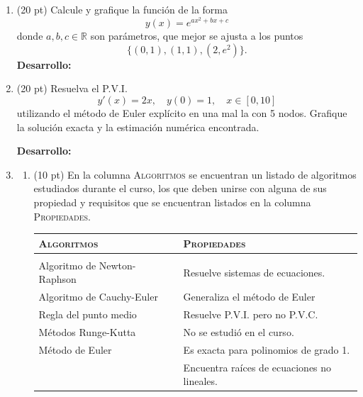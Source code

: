 \documentclass[11pt]{article}
\begin{document}
\begin{enumerate}
\newpage 
\item  (20 pt)
Calcule y grafique la funci\'on de la forma
$$
y(x)=e^{ax^2+bx+c}
$$
donde $a,b,c\in\mathbb{R}$ son par\'ametros, que mejor se ajusta a los puntos
$$
\{(0,1),(1,1),(2,e^2)\}.
$$
\textbf{Desarrollo:}


\newpage
\item  (20 pt) Resuelva el P.V.I.
$$ 
y'(x)=2x, \quad y(0)=1, \quad x\in[0,10]
$$
utilizando el método de Euler explícito en una mal
la con 5 nodos. Grafique la soluci\'on exacta y la estimaci\'on num\'erica encontrada.

\textbf{Desarrollo:}

\newpage
\item  \begin{enumerate}
\item (10 pt) En la columna \textsc{Algoritmos} se encuentran un listado de algoritmos estudiados durante el curso, los que deben unirse con alguna de sus propiedad y requisitos que se encuentran listados en la columna \textsc{Propiedades}.
\begin{center}
	\begin{tabular}{||p{4cm}|p{7cm}|p{4cm}||}
    \hline \hline
	\textsc{Algoritmos}	& & \textsc{Propiedades}    \\ \hline & &\\ \hline  
    Algoritmo de Newton-Raphson & & Resuelve sistemas de ecuaciones. \\ \hline
    Algoritmo de Cauchy-Euler	& & Generaliza el método de Euler\\ \hline
    Regla del punto medio		& & Resuelve P.V.I. pero no P.V.C.\\ \hline
    M\'etodos Runge-Kutta		& & No se estudi\'o en el curso.\\ \hline
	M\'etodo de Euler			& & Es exacta para polinomios de grado 1.\\ \hline
    							& & Encuentra ra\'ices de ecuaciones no lineales.\\ \hline
   \end{tabular}
\end{center}


\end{enumerate}
\end{enumerate}
\end{document}
